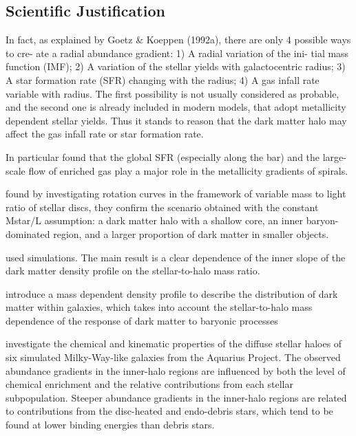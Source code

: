 \documentclass[11pt, a4paper, onecolumn]{article}
\begin{document}

\begin{multicols}{2}

\section{Scientific Justification}

    \citet{sanchez12} In fact, as explained by Goetz \& Koeppen (1992a), there
    are only 4 possible ways to cre- ate a radial abundance gradient: 1) A
    radial variation of the ini- tial mass function (IMF); 2) A variation of
    the stellar yields with galactocentric radius; 3) A star formation rate
    (SFR) changing with the radius; 4) A gas infall rate variable with radius.
    The first possibility is not usually considered as probable, and the second
    one is already included in modern models, that adopt metallicity dependent
    stellar yields. Thus it stands to reason that the dark matter halo may
    affect the gas infall rate or star formation rate.


    In particular 
    \citet{martel13} found that the global SFR (especially along the bar) and
    the large-scale flow of enriched gas play a major role in the metallicity
    gradients of spirals.

    \citet{portinari10} found by investigating rotation curves in the framework
    of variable mass to light ratio of stellar discs, they confirm the scenario
    obtained with the constant Mstar/L assumption: a dark matter halo with a
    shallow core, an inner baryon-dominated region, and a larger proportion of
    dark matter in smaller objects.


    \citet{dicintio14} used simulations. The main result is a clear dependence
    of the inner slope of the dark matter density profile on the
    stellar-to-halo mass ratio.

    \citet{dicintio14b} introduce a mass dependent density profile to describe
    the distribution of dark matter within galaxies, which takes into account
    the stellar-to-halo mass dependence of the response of dark matter to
    baryonic processes

    \citet{tissera13} investigate the chemical and kinematic properties of the
    diffuse stellar haloes of six simulated Milky-Way-like galaxies from the
    Aquarius Project. The observed abundance gradients in the inner-halo
    regions are influenced by both the level of chemical enrichment and the
    relative contributions from each stellar subpopulation. Steeper abundance
    gradients in the inner-halo regions are related to contributions from the
    disc-heated and endo-debris stars, which tend to be found at lower binding
    energies than debris stars. 


\end{multicols}
\end{document}
